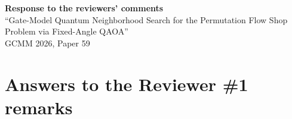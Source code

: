 \documentclass[11pt]{article}
\begin{document}
\begin{center}
{\large\bf Response to the reviewers' comments}\\[2mm]
``Gate-Model Quantum Neighborhood Search for the Permutation Flow Shop Problem via Fixed-Angle QAOA''\\[1mm]
GCMM 2026, Paper 59
\end{center}





\section*{Answers to the Reviewer \#1 remarks}
\end{document}
